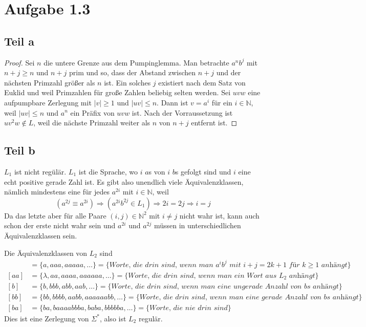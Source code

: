 \documentclass[10pt,a4paper]{article}
\begin{document}
\section{Aufgabe 1.3}

\subsection{Teil a}

\begin{proof}
  Sei $n$ die untere Grenze aus dem Pumpinglemma.
  Man betrachte $a^{n}b^{j}$ mit $n + j \ge n$ und $n + j$ prim und so, dass der Abstand zwischen $n + j$ und der nächsten Primzahl größer als $n$ ist.
  Ein solches $j$ existiert nach dem Satz von Euklid und weil Primzahlen für große Zahlen beliebig selten werden.
  Sei $uvw$ eine aufpumpbare Zerlegung mit $|v| \ge 1$ und $|uv| \le n$.
  Dann ist $v = a^{i}$ für ein $i \in \mathbb{N}$, weil $|uv| \le n$ und $a^{n}$ ein Präfix von $uvw$ ist.
  Nach der Vorraussetzung ist $uv^{2}w \not\in L$, weil die nächste Primzahl weiter als $n$ von $n + j$ entfernt ist.
\end{proof}

\subsection{Teil b}

$L_{1}$ ist nicht regülär.
$L_{1}$ ist die Sprache, wo $i$ $a$s von $i$ $b$s gefolgt sind und $i$ eine echt positive gerade Zahl ist.
Es gibt also unendlich viele Äquivalenzklassen, nämlich mindestens eine für jedes $a^{2i}$ mit $i \in \mathbb{N}$, weil
\begin{equation}
  (a^{2j} \equiv a^{2i}) \Rightarrow (a^{2i}b^{2j} \in L_{1}) \Rightarrow 2i = 2j \Rightarrow i = j
\end{equation}
Da das letzte aber für alle Paare $(i, j) \in \mathbb{N}^{2}$ mit $i \ne j$ nicht wahr ist, kann auch schon der erste nicht wahr sein und $a^{2i}$ und $a^{2j}$ müssen in unterschiedlichen Äquivalenzklassen sein.

Die Äquivalenzklassen von $L_{2}$ sind
\begin{align*}
  [a] & = \{ a, aaa, aaaaa, \dots \} = \{ \textit{Worte, die drin sind, wenn man $a^{i}b^{j}$ mit $i + j = 2k + 1$ für $k \ge 1$ anhängt} \}\\
  [aa] & = \{ \lambda, aa, aaaa, aaaaaa, \dots \} = \{ \textit{Worte, die drin sind, wenn man ein Wort aus $L_{2}$ anhängt} \}\\
  [b] & = \{ b, bbb, abb, aab, \dots \} = \{ \textit{Worte, die drin sind, wenn man eine ungerade Anzahl von $b$s anhängt} \}\\
  [bb] & = \{ bb, bbbb, aabb, aaaaaabb, \dots \} = \{ \textit{Worte, die drin sind, wenn man eine gerade Anzahl von $b$s anhängt} \}\\
  [ba] & = \{ ba, baaaabbba, baba, bbbbba, \dots \} = \{ \textit{Worte, die nie drin sind} \}
\end{align*}
Dies ist eine Zerlegung von $\Sigma^{*}$, also ist $L_{2}$ regulär.
\end{document}

